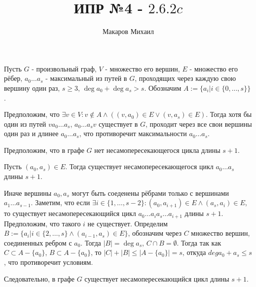 \documentclass{article}
\title{ИПР №4 - $2.6.2c$}
\author{Макаров Михаил}
\date{}
\newcommand{\range}[2]{
    \{#1, \ldots, #2 \}
}
\begin{document}
	\maketitle
	Пусть $G$ - произвольный граф, $V$ - множество его вершин, $E$ - множество его рёбер, $a_0 \ldots a_s$ -
	максимальный из путей в $G$, проходящих через каждую свою вершину один раз, $s \ge 3$, $ \deg a_0 + \deg a_s > s$.
    Обозначим $A := \{ a_i | i \in \range{0}{s} \}$.
    
    Предположим, что $ \exists v \in V: v \notin A \land ( (v, a_0) \in E \lor (v, a_s) \in E) $. Тогда 
    хотя бы один из путей $va_0 \ldots a_s$, $a_0 \ldots a_sv$ существует в $G$, проходит через все свои вершины
    один раз и длинее $a_0 \ldots a_s$, что противоречит максимальности $a_0 \ldots a_s$.

    Предположим, что в графе $G$ нет несамопересекающегося цикла длины $s + 1$.
    
    Пусть $(a_0, a_s) \in E$. Тогда существует несамопересекающегося цикл $a_0 \ldots a_s$ длины $s + 1$.
    
    Иначе вершины $a_0, a_s$ могут быть соеденены рёбрами только с вершинами $a_1 \ldots a_{s - 1} $. 
    Заметим, что если $ \exists i \in \range{1}{s - 2}: (a_0, a_{i + 1}) \in E \land (a_s, a_i) \in E$, то
    существует несамопересекающийся цикл $a_0\ldots a_i a_s \ldots a_{i + 1} $ длины $s + 1$. Предположим,
    что такого $i$ не существует. Определим $B := \{ a_i| i \in \range{2}{s} \land (a_{i - 1}, a_s) \in E \}$,
    обозначим через $C$ множество вершин, соединенных ребром с $a_0$.
    Тогда $|B| = \deg a_s$, $ C \cap B = \emptyset$. Тогда так как $C \subset A - \{ a_0 \}$,
    $B \subset A - \{ a_0 \}$, то $|C| + |B| \leq |A - \{ a_0 \}| = s$, откуда
    $deg a_0 + a_s \leq s$, что противоречит условиям. 
    
    Следовательно, в графе $G$ существует несамопересекающийся цикл длины $s + 1$.
    
	
\end{document}
